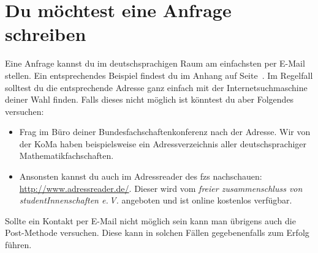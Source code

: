 \documentclass[10pt,twoside,a5paper,openright]{book}
\begin{document}
\section{Du möchtest eine Anfrage schreiben}
\label{musteranfrage_fachschaft}
Eine Anfrage kannst du im deutschsprachigen Raum am einfachsten per E-Mail stellen. Ein entsprechendes Beispiel findest du im Anhang auf Seite~\pageref{musteranfrage_txt}. Im Regelfall solltest du die entsprechende Adresse ganz einfach mit der Internetsuchmaschine deiner Wahl finden. Falls dieses nicht möglich ist könntest du aber Folgendes versuchen:
\begin{itemize}
	\item Frag im Büro deiner Bundesfachschaftenkonferenz nach der Adresse. Wir von der KoMa haben beispielsweise ein Adressverzeichnis aller deutschsprachiger Mathematikfachschaften.
	\item Ansonsten kannst du auch im Adressreader des fzs nachschauen: \url{http://www.adressreader.de/}. Dieser wird vom \emph{freier zusammenschluss von studentInnenschaften e.\,V.} angeboten und ist online kostenlos verfügbar.
\end{itemize}
Sollte ein Kontakt per E-Mail nicht möglich sein kann man übrigens auch die Post-Methode versuchen. Diese kann in solchen Fällen gegebenenfalls zum Erfolg führen.
\end{document}
